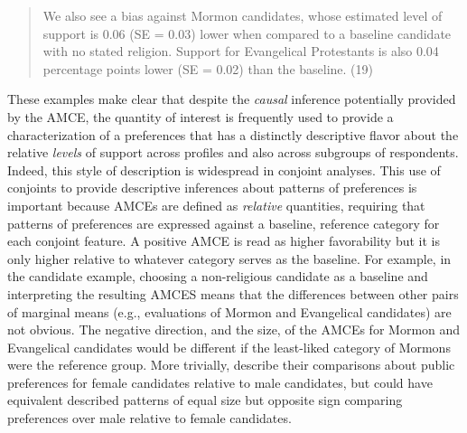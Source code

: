 \documentclass[a4paper,12pt]{article}\usepackage[]{graphicx}\usepackage[]{color}
\begin{document}
\begin{quote}
We also see a bias against Mormon candidates, whose estimated level of support is 0.06 (SE = 0.03) lower when compared to a baseline candidate with no stated religion. Support for Evangelical Protestants is also 0.04 percentage points lower (SE = 0.02) than the baseline. (19)
\end{quote}

\noindent These examples make clear that despite the \textit{causal} inference potentially provided by the AMCE, the quantity of interest is frequently used to provide a characterization of a preferences that has a distinctly descriptive flavor about the relative \textit{levels} of support across profiles and also across subgroups of respondents. Indeed, this style of description is widespread in conjoint analyses. This use of conjoints to provide descriptive inferences about patterns of preferences is important because AMCEs are defined as \textit{relative} quantities, requiring that patterns of preferences are expressed against a baseline, reference category for each conjoint feature. A positive AMCE is read as higher favorability but it is only higher relative to whatever category serves as the baseline. For example, in the \citeauthor{HainmuellerHopkinsYamamoto2014} candidate example, choosing a non-religious candidate as a baseline and interpreting the resulting AMCES means that the differences between other pairs of marginal means (e.g., evaluations of Mormon and Evangelical candidates) are not obvious. The negative direction, and the size, of the AMCEs for Mormon and Evangelical candidates would be different if the least-liked category of Mormons were the reference group. More trivially, \citet{TeeleKallaRosenbluth2018} describe their comparisons about public preferences for female candidates relative to male candidates, but could have equivalent described patterns of equal size but opposite sign comparing preferences over male relative to female candidates.
\end{document}
